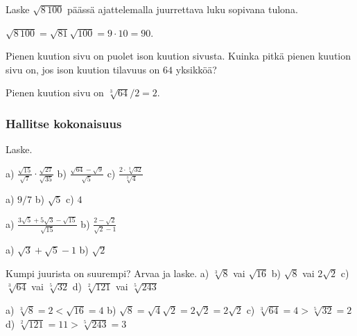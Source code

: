 \begin{tehtavasivu}
\begin{tehtava}
Laske $\sqrt{8\,100}$ päässä ajattelemalla juurrettava luku sopivana tulona.
\begin{vastaus}
$\sqrt{8\,100}=\sqrt{81}\sqrt{100}=9\cdot 10=90$.
\end{vastaus}
\end{tehtava}

\begin{tehtava}
Pienen kuution sivu on puolet ison kuution sivusta. Kuinka pitkä pienen kuution sivu on, jos ison kuution tilavuus on $64$ yksikköä?
\begin{vastaus}
Pienen kuution sivu on $\sqrt[3]{64}/2=2$.
\end{vastaus}
\end{tehtava}

\subsubsection*{Hallitse kokonaisuus}

Laske.
\begin{tehtava}
a) $ \frac{\sqrt{15}}{\sqrt{7}} \cdot  \frac{\sqrt{27}}{\sqrt{35}}$  \quad b)  $ \frac{\sqrt{64}-\sqrt{9}}{\sqrt{5}}$   \quad c)  $ \frac{2 \cdot \sqrt[3]{32}}{\sqrt[3]{4}}$ \quad 
\begin{vastaus}
a) $9/7$ \quad b) $\sqrt{5}$ \quad c) $4$ \quad
\end{vastaus}
\end{tehtava}

\begin{tehtava} 
a) $ \frac{3\sqrt{5}+5\sqrt{3}-\sqrt{15}}{\sqrt{15}}$  \quad b)  $ \frac{2-\sqrt{2}}{\sqrt{2}-1}$   \quad
\begin{vastaus}
a) $\sqrt{3}+\sqrt{5}-1$ \quad b) $\sqrt{2}$ \quad
\end{vastaus}
\end{tehtava}

\begin{tehtava} Kumpi juurista on suurempi? Arvaa ja laske.
a) $\sqrt[3]{8}$ vai $\sqrt{16}$ \quad b)  $\sqrt{8}$ vai $2\sqrt{2}$  \quad c) $\sqrt[3]{64}$ vai $\sqrt[5]{32}$ \quad d) $\sqrt[2]{121}$ vai $\sqrt[5]{243}$ 
\begin{vastaus}
a) $\sqrt[3]{8}=2<\sqrt{16}=4$ \quad b) $\sqrt{8}=\sqrt{4}\sqrt{2}=2\sqrt{2} = 2\sqrt{2}$ \quad c) $\sqrt[3]{64}=4>\sqrt[5]{32}=2$ \quad d) $\sqrt[2]{121}=11 >\sqrt[5]{243}=3$ 
\end{vastaus}
\end{tehtava}



\end{tehtavasivu}

